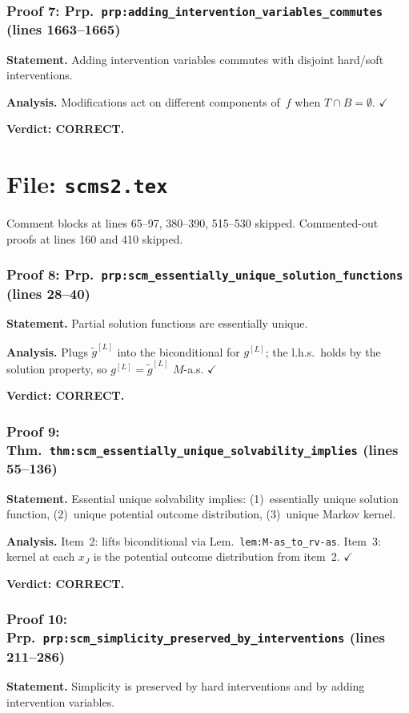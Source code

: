 \documentclass{article}
\begin{document}
\section{Proof 7: Prp.\ \texttt{prp:adding\_intervention\_variables\_commutes}
(lines 1663--1665)}
\textbf{Statement.} Adding intervention variables commutes with disjoint
hard/soft interventions.

\textbf{Analysis.} Modifications act on different components of~$f$ when
$T\cap B=\emptyset$.  $\checkmark$

\textbf{Verdict: CORRECT.}

\part*{File: \texttt{scms2.tex}}

Comment blocks at lines 65--97, 380--390, 515--530 skipped.
Commented-out proofs at lines 160 and 410 skipped.

\section{Proof 8: Prp.\ \texttt{prp:scm\_essentially\_unique\_solution\_functions}
(lines 28--40)}
\textbf{Statement.} Partial solution functions are essentially unique.

\textbf{Analysis.} Plugs $\tilde g^{[L]}$ into the biconditional for
$g^{[L]}$; the l.h.s.\ holds by the solution property, so
$g^{[L]}=\tilde g^{[L]}$ $M$-a.s.  $\checkmark$

\textbf{Verdict: CORRECT.}

\section{Proof 9: Thm.\ \texttt{thm:scm\_essentially\_unique\_solvability\_implies}
(lines 55--136)}
\textbf{Statement.} Essential unique solvability implies: (1)~essentially unique
solution function, (2)~unique potential outcome distribution, (3)~unique
Markov kernel.

\textbf{Analysis.} Item~2: lifts biconditional via Lem.\ \texttt{lem:M-as\_to\_rv-as}.
Item~3: kernel at each $x_J$ is the potential outcome distribution from item~2.
$\checkmark$

\textbf{Verdict: CORRECT.}

\section{Proof 10: Prp.\ \texttt{prp:scm\_simplicity\_preserved\_by\_interventions}
(lines 211--286)}
\textbf{Statement.} Simplicity is preserved by hard interventions and by adding
intervention variables.
\end{document}
